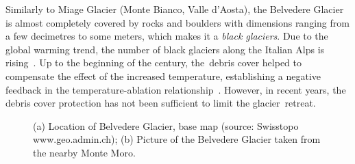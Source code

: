 Similarly to Miage Glacier (Monte Bianco, Valle d’Aosta), the Belvedere Glacier is almost
completely covered by rocks and boulders with dimensions ranging from a few decimetres to
some meters, which makes it a \textit{black glaciers}.
Due to the global warming trend, the number of black glaciers along the Italian Alps is
rising~\citep{Diolaiuti2003}.
Up to the beginning of the century, the~debris cover helped to compensate the effect of
the increased temperature, establishing a negative feedback in the temperature-ablation
relationship~\citep{Roethlisberger1985,Diolaiuti2003}.
However, in recent years, the debris cover protection has not been sufficient to limit
the glacier~retreat.

\begin{figure}
    \centering
    \caption{(a) Location of Belvedere Glacier, base map (source: Swisstopo
        www.geo.admin.ch); (b) Picture of the Belvedere Glacier taken from the nearby Monte Moro.}
    \label{fig:1:studyarea}
\end{figure}

